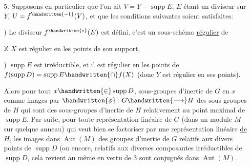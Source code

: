 5. Supposons en particulier que l'on ait $V=Y-\operatorname{supp}E$, $E$ étant un diviseur  sur $Y$,  $U=f^{\handwritten{-1}}(V)$, et que  les conditions suivantes soient satisfaites:


) Le diviseur  $f^{\handwritten{*}}(E)$ est défini, c'est un sous-schéma \uline{régulier} de


$\mathbb{X}$  $X$ est régulier en les points de son support\handwritten{)},

) $\operatorname{supp}E$ est irréductible, et il est régulier en les points de $f(\operatorname{supp}D)=\operatorname{supp}E\handwritten{\cap}f(X)$ (donc $Y$ est régulier en ses points).

Alors pour tout $x\handwritten{\in}\operatorname{supp}D$,  sous-groupes d'inertie de $G$ en $x$  comme images par $\handwritten{\phi}:G\handwritten{\longrightarrow}H$ des sous-groupes de $H$ qui sont des sous-groupes d'inertie de $H$ relativement au point maximal de $\operatorname{supp}E$. Par suite, pour toute représentation linéaire de $G$ (dans un module $M$ sur quelque anneau)  qui veut bien se factoriser par une représentation linéaire \uline{de} $H$, les images dans $\operatorname{Aut}(M)$ des groupes d'inertie  de $G$ relatifs aux divers points de $\operatorname{supp}D$ (ou encore, relatifs aux diverses composantes irréductibles de $\operatorname{supp}D$, cela revient au même en vertu de 3\handwritten{)} sont conjugués dans $\operatorname{Aut}(M)$.

